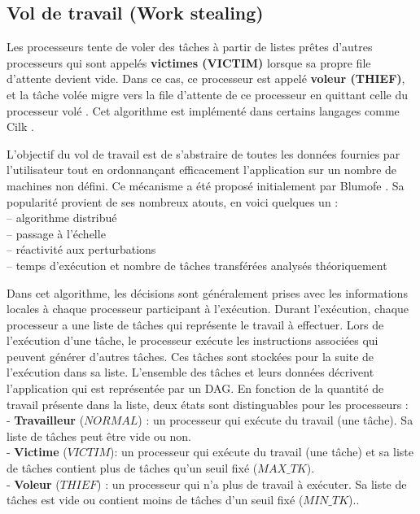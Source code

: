 \subsection{Vol de travail (Work stealing)}
%
Les processeurs tente de voler des tâches à partir de listes prêtes d'autres processeurs qui sont appelés \textbf{victimes (VICTIM)} lorsque sa propre file d'attente devient vide. 
Dans ce cas, ce processeur est appelé \textbf{voleur (THIEF)}, et la tâche volée migre vers la file d'attente de ce processeur en quittant celle du processeur volé \cite{SPO09}. 
Cet algorithme est implémenté dans certains langages comme Cilk \cite{BLU95}. 

L'objectif du vol de travail est de s’abstraire de toutes les données fournies par l’utilisateur tout en ordonnançant efficacement l’application sur un nombre de machines non défini. 
Ce mécanisme a été proposé initialement par Blumofe \cite{BLU95}.
Sa popularité provient de ses nombreux atouts, en voici  quelques un :\\
– algorithme distribué\\
– passage à l’échelle\\
– réactivité aux perturbations\\
– temps d’exécution et nombre de tâches transférées analysés théoriquement

Dans cet algorithme, les décisions sont généralement prises avec les informations locales à chaque processeur participant à l’exécution. 
Durant l’exécution, chaque processeur a une liste de tâches qui représente le travail à effectuer. 
Lors de l’exécution d’une tâche, le processeur exécute les instructions associées qui peuvent générer d’autres tâches. 
Ces tâches sont stockées pour la suite de l’exécution dans sa liste. 
L’ensemble des tâches et leurs données décrivent l’application qui est représentée par un DAG.
En fonction de la quantité de travail présente dans la liste, deux états sont distinguables pour les processeurs :
\\
- \textbf{Travailleur} ($NORMAL$) : un processeur qui exécute du travail (une tâche). Sa liste de tâches peut être vide ou non.\\
- \textbf{Victime} ($VICTIM$): un processeur qui exécute du travail (une tâche) et sa liste de tâches contient plus de tâches qu'un seuil fixé ($MAX\_TK$).\\
- \textbf{Voleur} ($THIEF$) : un processeur qui n’a plus de travail à exécuter. Sa liste de tâches est vide ou contient moins de tâches d'un seuil fixé ($MIN\_TK$).. 

